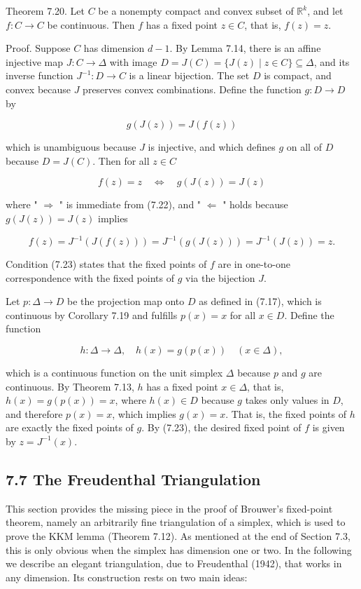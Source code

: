 \documentclass[12pt]{article}
\begin{document}
Theorem 7.20. Let $C$ be a nonempty compact and convex subset of $\mathbb{R}^{k}$, and let $f: C \rightarrow C$ be continuous. Then $f$ has a fixed point $z \in C$, that is, $f(z)=z$.

Proof. Suppose $C$ has dimension $d-1$. By Lemma 7.14, there is an affine injective map $J: C \rightarrow \Delta$ with image $D=J(C)=\{J(z) \mid z \in C\} \subseteq \Delta$, and its inverse function $J^{-1}: D \rightarrow C$ is a linear bijection. The set $D$ is compact, and convex because $J$ preserves convex combinations. Define the function $g: D \rightarrow D$ by


\begin{equation*}
g(J(z))=J(f(z)) \tag{7.22}
\end{equation*}


which is unambiguous because $J$ is injective, and which defines $g$ on all of $D$ because $D=J(C)$. Then for all $z \in C$


\begin{equation*}
f(z)=z \quad \Leftrightarrow \quad g(J(z))=J(z) \tag{7.23}
\end{equation*}


where " $\Rightarrow$ " is immediate from (7.22), and " $\Leftarrow$ " holds because $g(J(z))=J(z)$ implies

$$
f(z)=J^{-1}(J(f(z)))=J^{-1}(g(J(z)))=J^{-1}(J(z))=z .
$$

Condition (7.23) states that the fixed points of $f$ are in one-to-one correspondence with the fixed points of $g$ via the bijection $J$.

Let $p: \Delta \rightarrow D$ be the projection map onto $D$ as defined in (7.17), which is continuous by Corollary 7.19 and fulfills $p(x)=x$ for all $x \in D$. Define the function

$$
h: \Delta \rightarrow \Delta, \quad h(x)=g(p(x)) \quad(x \in \Delta),
$$

which is a continuous function on the unit simplex $\Delta$ because $p$ and $g$ are continuous. By Theorem 7.13, $h$ has a fixed point $x \in \Delta$, that is, $h(x)=g(p(x))=x$, where $h(x) \in D$ because $g$ takes only values in $D$, and therefore $p(x)=x$, which implies $g(x)=x$. That is, the fixed points of $h$ are exactly the fixed points of $g$. By (7.23), the desired fixed point of $f$ is given by $z=J^{-1}(x)$.

\subsection*{7.7 The Freudenthal Triangulation}
This section provides the missing piece in the proof of Brouwer's fixed-point theorem, namely an arbitrarily fine triangulation of a simplex, which is used to prove the KKM lemma (Theorem 7.12). As mentioned at the end of Section 7.3, this is only obvious when the simplex has dimension one or two. In the following we describe an elegant triangulation, due to Freudenthal (1942), that works in any dimension. Its construction rests on two main ideas:
\end{document}
